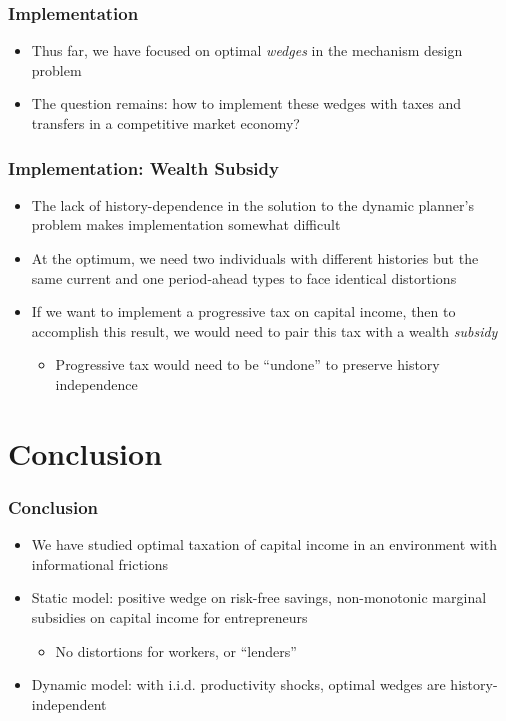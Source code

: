 \documentclass{beamer}
\begin{document}
\begin{frame}
    \frametitle{Implementation}

    \begin{itemize}
        \item Thus far, we have focused on optimal \textit{wedges} in the mechanism design problem
        \item The question remains: how to implement these wedges with taxes and transfers in a competitive market economy?
    \end{itemize}

\end{frame}

\begin{frame}
    \frametitle{Implementation: Wealth Subsidy}

    \begin{itemize}
        \item The lack of history-dependence in the solution to the dynamic planner's problem makes implementation somewhat difficult
        \item At the optimum, we need two individuals with different histories but the same current and one period-ahead types to face identical distortions 
        \item If we want to implement a progressive tax on capital income, then to accomplish this result, we would need to pair this tax with a wealth \textit{subsidy}
        \begin{itemize}
            \item Progressive tax would need to be ``undone'' to preserve history independence
        \end{itemize}
    \end{itemize}

\end{frame}

\section{Conclusion}

\begin{frame}
    \frametitle{Conclusion}

    \begin{itemize}
        \item We have studied optimal taxation of capital income in an environment with informational frictions
        \item Static model: positive wedge on risk-free savings, non-monotonic marginal subsidies on capital income for entrepreneurs 
        \begin{itemize}
            \item No distortions for workers, or ``lenders''
        \end{itemize}
        \item Dynamic model: with i.i.d. productivity shocks, optimal wedges are history-independent
    \end{itemize}

\end{frame}
\end{document}
